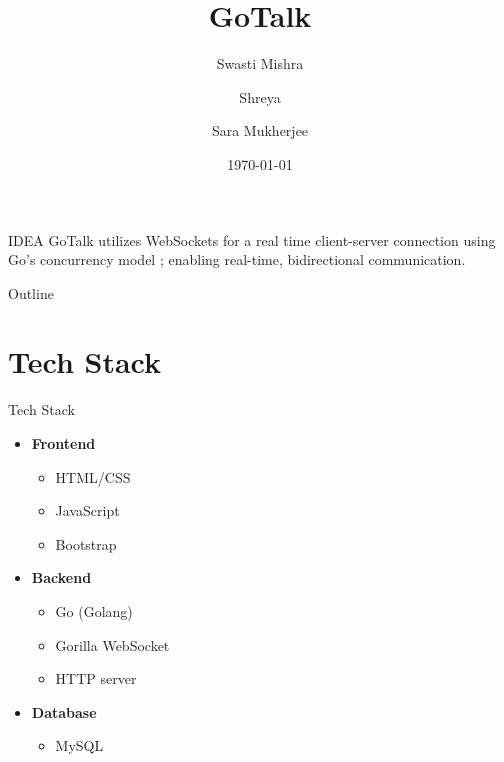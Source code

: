 \documentclass{beamer}
\title{GoTalk}
\author{Swasti Mishra \and Shreya \and Sara Mukherjee}
\date{\today}
\begin{document}
\begin{frame}
    \titlepage
\end{frame}

\begin{frame}{IDEA}
GoTalk utilizes WebSockets for a real time client-server connection using Go's concurrency model ; enabling real-time, bidirectional communication.
\end{frame}
\begin{frame}{Outline}
    \tableofcontents
\end{frame}

\section{Tech Stack}
\begin{frame}{Tech Stack}
    \begin{itemize}
        \item \textbf{Frontend}
        \begin{itemize}
            \item HTML/CSS
            \item JavaScript
            \item Bootstrap
        \end{itemize}
        \item \textbf{Backend}
        \begin{itemize}
            \item Go (Golang)
            \item Gorilla WebSocket
            \item HTTP server
        \end{itemize}
        \item \textbf{Database}
        \begin{itemize}
            \item MySQL
        \end{itemize}
    \end{itemize}
\end{frame}

\end{document}

